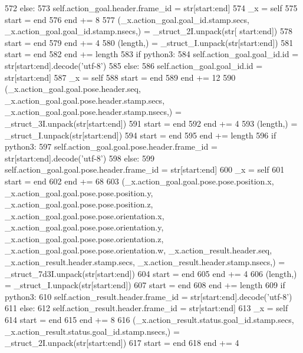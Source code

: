 \begin{DoxyCode}
572       \textcolor{keywordflow}{else}:
573         self.action\_goal.header.frame\_id = str[start:end]
574       \_x = self
575       start = end
576       end += 8
577       (\_x.action\_goal.goal\_id.stamp.secs, \_x.action\_goal.goal\_id.stamp.nsecs,) = \_struct\_2I.unpack(str[
      start:end])
578       start = end
579       end += 4
580       (length,) = \_struct\_I.unpack(str[start:end])
581       start = end
582       end += length
583       \textcolor{keywordflow}{if} python3:
584         self.action\_goal.goal\_id.id = str[start:end].decode(\textcolor{stringliteral}{'utf-8'})
585       \textcolor{keywordflow}{else}:
586         self.action\_goal.goal\_id.id = str[start:end]
587       \_x = self
588       start = end
589       end += 12
590       (\_x.action\_goal.goal.pose.header.seq, \_x.action\_goal.goal.pose.header.stamp.secs, 
      \_x.action\_goal.goal.pose.header.stamp.nsecs,) = \_struct\_3I.unpack(str[start:end])
591       start = end
592       end += 4
593       (length,) = \_struct\_I.unpack(str[start:end])
594       start = end
595       end += length
596       \textcolor{keywordflow}{if} python3:
597         self.action\_goal.goal.pose.header.frame\_id = str[start:end].decode(\textcolor{stringliteral}{'utf-8'})
598       \textcolor{keywordflow}{else}:
599         self.action\_goal.goal.pose.header.frame\_id = str[start:end]
600       \_x = self
601       start = end
602       end += 68
603       (\_x.action\_goal.goal.pose.pose.position.x, \_x.action\_goal.goal.pose.pose.position.y, 
      \_x.action\_goal.goal.pose.pose.position.z, \_x.action\_goal.goal.pose.pose.orientation.x, 
      \_x.action\_goal.goal.pose.pose.orientation.y, \_x.action\_goal.goal.pose.pose.orientation.z, \_x.action\_goal.goal.pose.pose.orientation.w, 
      \_x.action\_result.header.seq, \_x.action\_result.header.stamp.secs, \_x.action\_result.header.stamp.nsecs,) = 
      \_struct\_7d3I.unpack(str[start:end])
604       start = end
605       end += 4
606       (length,) = \_struct\_I.unpack(str[start:end])
607       start = end
608       end += length
609       \textcolor{keywordflow}{if} python3:
610         self.action\_result.header.frame\_id = str[start:end].decode(\textcolor{stringliteral}{'utf-8'})
611       \textcolor{keywordflow}{else}:
612         self.action\_result.header.frame\_id = str[start:end]
613       \_x = self
614       start = end
615       end += 8
616       (\_x.action\_result.status.goal\_id.stamp.secs, \_x.action\_result.status.goal\_id.stamp.nsecs,) = 
      \_struct\_2I.unpack(str[start:end])
617       start = end
618       end += 4

\end{DoxyCode}
